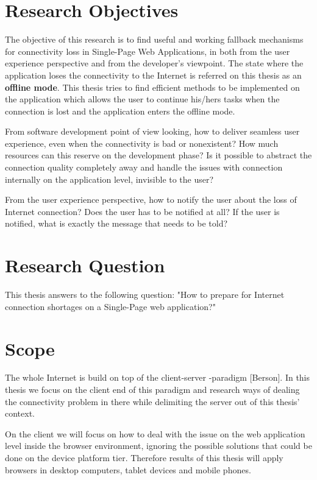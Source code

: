 \section{Research Objectives}
The objective of this research is to find useful and working fallback mechanisms for connectivity loss in Single-Page Web Applications, in both from the user experience perspective and from the developer's viewpoint. The state where the application loses the connectivity to the Internet is referred on this thesis as an \textbf{offline mode}. This thesis tries to find efficient methods to be implemented on the application which allows the user to continue his/hers tasks when the connection is lost and the application enters the offline mode.

From software development point of view looking, how to deliver seamless user experience, even when the connectivity is bad or nonexistent? How much resources can this reserve on the development phase? Is it possible to abstract the connection quality completely away and handle the issues with connection internally on the application level, invisible to the user?

From the user experience perspective, how to notify the user about the loss of Internet connection? Does the user has to be notified at all? If the user is notified, what is exactly the message that needs to be told? 






\section{Research Question}
This thesis answers to the following question: "How to prepare for Internet connection shortages on a Single-Page web application?"






\section{Scope}
The whole Internet is build on top of the client-server -paradigm [Berson]. In this thesis we focus on the client end of this paradigm and research ways of dealing the connectivity problem in there while delimiting the server out of this thesis' context. 

On the client we will focus on how to deal with the issue on the web application level inside the browser environment, ignoring the possible solutions that could be done on the device platform tier. Therefore results of this thesis will apply browsers in desktop computers, tablet devices and mobile phones.


